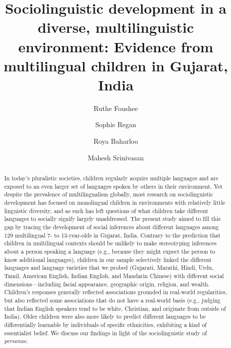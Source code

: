 \documentclass{foushee-adapted-preprint}
\begin{document}
\title{Sociolinguistic development in a diverse, multilinguistic environment: Evidence from multilingual children in Gujarat, India}

\author[1,2, \Letter]{Ruthe Foushee}
\author[2]{Sophie Regan}
\author[2]{Roya Baharloo}
\author[2]{Mahesh Srinivasan}

\maketitle
%
\begin{abstract}
\noindent
In today's pluralistic societies, children regularly acquire multiple languages and are exposed to an even larger set of languages spoken by others in their environment. Yet despite the prevalence of multilingualism globally, most research on sociolinguistic development has focused on monolingual children in environments with relatively little linguistic diversity, and as such has left questions of what children take different languages to socially signify largely unaddressed. The present study aimed to fill this gap by tracing the development of social inferences about different languages among 129 multilingual 7- to 13-year-olds in Gujarat, India. Contrary to the prediction that children in multilingual contexts should be unlikely to make stereotyping inferences about a person speaking a language (e.g., because they might expect the person to know additional languages), children in our sample selectively linked the different languages and language varieties that we probed (Gujarati, Marathi, Hindi, Urdu, Tamil, American English, Indian English, and Mandarin Chinese) with different social dimensions---including facial appearance, geographic origin, religion, and wealth. Children's responses generally reflected associations grounded in real-world regularities, but also reflected some associations that do not have a real-world basis (e.g., judging that Indian English speakers tend to be white, Christian, and originate from outside of India). %
Older children were also more likely to predict different languages to be differentially learnable by individuals of specific ethnicities, exhibiting a kind of essentialist belief. We discuss our findings in light of the sociolinguistic study of \textit{personae}.
\end{abstract}
\end{document}
